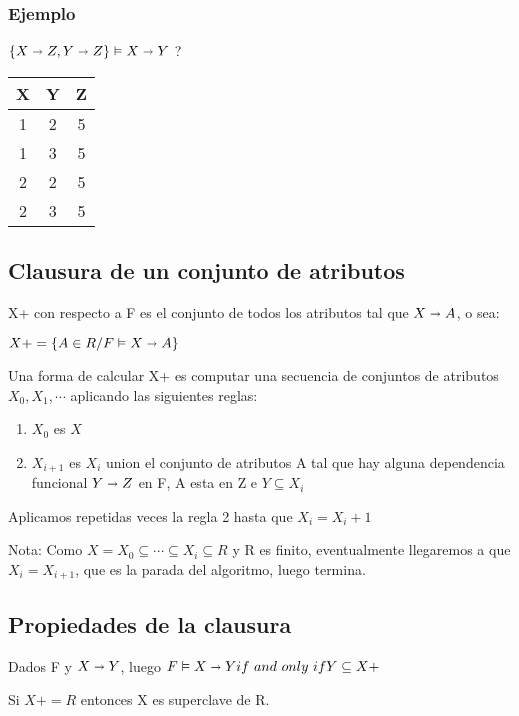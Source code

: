 \documentclass[10pt, a4paper,english,spanish]{article}
\newcommand{\imp}{\shortrightarrow}
\begin{document}
\subsubsection{Ejemplo}
$\{ X\imp Z, Y\imp Z\} \vDash X \imp Y$ ?

\begin{table}[H]\centering
    \begin{tabular}{c | c | c }
    X & Y & Z \\
    \hline
    1 & 2 & 5 \\
    1 & 3 & 5 \\
    2 & 2 & 5 \\
    2 & 3 & 5 \\

    \end{tabular}
\end{table}

\subsection{Clausura de un conjunto de atributos}
X+ con respecto a F es el conjunto de todos los atributos tal que $X \imp A$, o sea:

$X+ = \{A \in R / F\vDash X \imp A\}$

Una forma de calcular X+ es computar una secuencia de conjuntos de atributos $X_0, X_1, \dotsb$ aplicando las siguientes reglas:

\begin{enumerate}
\item $X_0$ es $X$
\item $X_{i+1}$ es $X_i$ union el conjunto de atributos A tal que hay alguna dependencia
 funcional $Y \imp Z$ en F, A esta en Z e $Y \subseteq X_i$
\end{enumerate}

Aplicamos repetidas veces la regla 2 hasta que $X_i = X_i+1$

Nota: Como $X = X_0 \subseteq \dotsb \subseteq X_i \subseteq R$ y R es finito,
 eventualmente llegaremos a que $X_i = X_{i+1}$, que es la parada del algoritmo,
 luego termina.

\subsection{Propiedades de la clausura}
Dados F y $X \imp Y$, luego $F \vDash X \imp Y \iff Y \subseteq X+$

Si $X+ = R$ entonces X es superclave de R.
\end{document}
